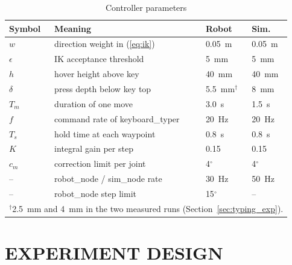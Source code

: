 \documentclass[letterpaper, 10 pt, conference]{ieeeconf}
\begin{document}
\begin{table}[t]
\caption{Controller parameters}
\label{tab:params}
\begin{center}
\footnotesize
\begin{tabular}{l>{\raggedright\arraybackslash}p{3.4cm}ll}
\toprule
Symbol & Meaning & Robot & Sim. \\
\midrule
$w$        & direction weight in (\ref{eq:ik})  & 0.05~m & 0.05~m \\
$\epsilon$ & IK acceptance threshold            & 5~mm   & 5~mm \\
$h$        & hover height above key             & 40~mm  & 40~mm \\
$\delta$   & press depth below key top          & 5.5~mm$^{\dagger}$ & 8~mm \\
$T_m$      & duration of one move               & 3.0~s  & 1.5~s \\
$f$        & command rate of keyboard\_typer    & 20~Hz  & 20~Hz \\
$T_s$      & hold time at each waypoint         & 0.8~s  & 0.8~s \\
$K$        & integral gain per step             & 0.15   & 0.15 \\
$c_m$      & correction limit per joint         & 4$^\circ$ & 4$^\circ$ \\
--         & robot\_node / sim\_node rate       & 30~Hz  & 50~Hz \\
--         & robot\_node step limit             & 15$^\circ$ & -- \\
\bottomrule
\multicolumn{4}{l}{\scriptsize $^{\dagger}$2.5~mm and 4~mm in the two measured runs (Section~\ref{sec:typing_exp}).}
\end{tabular}
\end{center}
\end{table}

\section{EXPERIMENT DESIGN}
\label{sec:design}
\end{document}
